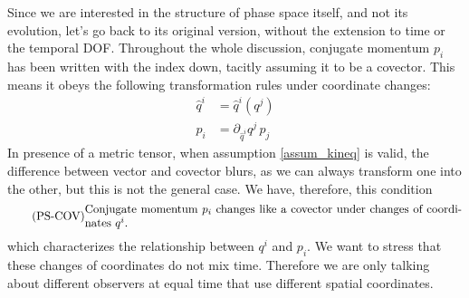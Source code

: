 Since we are interested in the structure of phase space itself, and not its evolution, let's go back to its original version, without the extension to time or the temporal DOF. Throughout the whole discussion, conjugate momentum $p_i$ has been written with the index down, tacitly assuming it to be a covector. This means it obeys the following transformation rules under coordinate changes:
\begin{equation}
	\begin{aligned}
 \hat{q}^i &= \hat{q}^i(q^j) \\
 \hat{p}_i &= \partial_{\hat{q}^i} q^j  \, p_j
	\end{aligned}
\end{equation}
In presence of a metric tensor, when assumption \ref{assum_kineq} is valid, the difference between vector and covector blurs, as we can always transform one into the other, but this is not the general case. We have, therefore, this condition
\begin{equation}
	\tag{PS-COV}\label{rp-cm-ps-condMomentumCovector}
	\eqtext{Conjugate momentum $p_i$ changes like a covector under changes of coordinates $q^i$.}
\end{equation}
which characterizes the relationship between $q^i$ and $p_i$. We want to stress that these changes of coordinates do not mix time. Therefore we are only talking about different observers at equal time that use different spatial coordinates.

